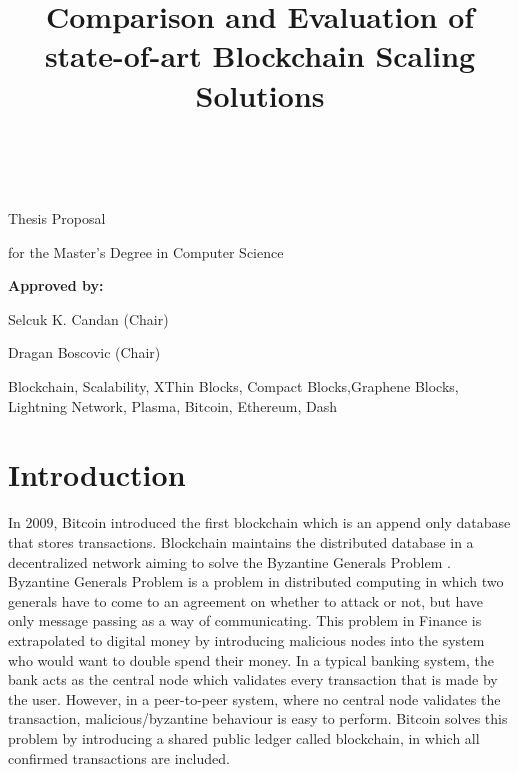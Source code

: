 \documentclass[journal,12pt,onecolumn,draftclsnofoot,]{IEEEtran}
\begin{document}
\title{ Comparison and Evaluation of  state-of-art Blockchain Scaling
Solutions}

\author{ \\
}




\maketitle

\centerline{Thesis Proposal} 
\centerline{for the Master's Degree in Computer Science}

\hfill \break
\hfill \break
\hfill \break
\hfill \break
\hfill \break
\hfill \break

\centerline{\textbf{Approved by:} }
\centerline{Selcuk K. Candan (Chair)} 
\centerline{Dragan Boscovic (Chair) }

\newpage


\begin{IEEEkeywords}
    Blockchain, Scalability, XThin Blocks, Compact Blocks,Graphene Blocks, Lightning Network, Plasma, Bitcoin,
    Ethereum, Dash
\end{IEEEkeywords}

\section{Introduction}
In 2009, Bitcoin\cite{bitcoin} introduced the first blockchain which is an
append only database that stores transactions. Blockchain maintains the
distributed database in a decentralized network aiming to solve the Byzantine
Generals Problem \cite{bgp}. Byzantine Generals Problem is a problem in
distributed computing in which two generals have to come to an agreement on
whether to attack or not, but have only message passing as a way of
communicating. This problem in Finance is extrapolated to digital money by
introducing malicious nodes into the system who would want to double spend their
money. In a typical banking system, the bank acts as the central node which
validates every transaction that is made by the user. However, in a peer-to-peer
system, where no central node validates the transaction, malicious/byzantine behaviour is
easy to perform. 
Bitcoin solves this problem by introducing a shared public ledger called
blockchain, in which all confirmed transactions are included.   
\end{document}

